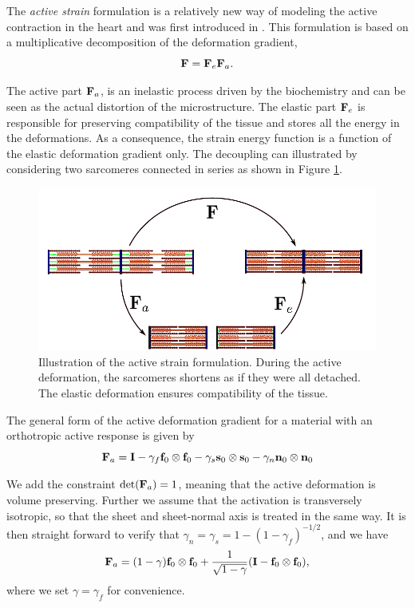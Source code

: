 The \emph{active strain} formulation is a relatively new way of modeling the
active contraction in the heart and was first introduced in
\cite{taber2000modeling}. This formulation is based on a
multiplicative decomposition of the deformation gradient, 
\begin{equation}
 \mathbf{F} = \mathbf{F}_e \mathbf{F}_a.
\label{eq:active_strain}
\end{equation}


The active part $\mathbf{F}_a$, is an inelastic process driven by the
biochemistry and can be seen as the actual distortion of the
microstructure. The elastic part $\mathbf{F}_e$ is responsible for preserving
compatibility of the tissue and stores all the energy in the
deformations. As a consequence, the strain energy function is a
function of the elastic deformation gradient only. The
decoupling can illustrated by considering two sarcomeres connected in
series as shown in Figure \ref{fig:actstrain}. 

\begin{figure}[htbp]
  \centering
    \includegraphics{chapters/introduction/figures/actstrain}
\caption{Illustration of the active strain formulation. During the active
deformation, the sarcomeres shortens as if they were all detached. The
elastic deformation ensures compatibility of the tissue.}
\label{fig:actstrain}
\end{figure}


The general form of the active deformation gradient for a
material with an orthotropic active response is given by
\begin{equation}
  \mathbf{F}_a =  \mathbf{I}
  - \gamma_f \mathbf{f}_0 \otimes \mathbf{f}_0
  - \gamma_s \mathbf{s}_0 \otimes \mathbf{s}_0
  - \gamma_n \mathbf{n}_0\otimes \mathbf{n}_0
 \label{eq:active_strain_Fa_general}
\end{equation}

We add the constraint $\det(\mathbf{F}_a) = 1$, meaning that the active
deformation is volume preserving. Further we assume that the activation is
transversely isotropic, so that the sheet and sheet-normal axis is
treated in the same way. It is then straight forward to verify that
$\gamma_n = \gamma_s =1- (1-\gamma_f)^{-1/2}$, and we have
\begin{equation}
  \mathbf{F}_a = (1 - \gamma) \mathbf{f}_0 \otimes \mathbf{f}_0  + \frac{1}{\sqrt{1 - \gamma}} (\mathbf{I} - \mathbf{f}_0 \otimes \mathbf{f}_0), 
 \label{eq:intro_active_strain_Fa_gjerald}
\end{equation}
where we set $\gamma = \gamma_f$ for convenience. 


